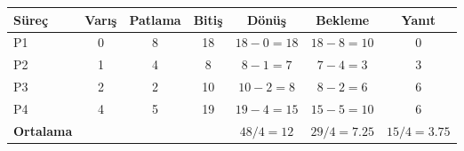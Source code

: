 \begin{tabular}{@{}lcccccc@{}}
\toprule
\textbf{Süreç} & \textbf{Varış} & \textbf{Patlama} & \textbf{Bitiş} & \textbf{Dönüş} & \textbf{Bekleme} & \textbf{Yanıt}\\
\midrule
P1 & 0 & 8 & 18 & $18-0=18$ & $18-8=10$ & 0\\
P2 & 1 & 4 & 8 & $8-1=7$ & $7-4=3$ & 3\\
P3 & 2 & 2 & 10 & $10-2=8$ & $8-2=6$ & 6\\
P4 & 4 & 5 & 19 & $19-4=15$ & $15-5=10$ & 6\\
\midrule
\textbf{Ortalama} &  &  &  & $48/4=12$ & $29/4=7.25$ & $15/4=3.75$\\
\bottomrule
\end{tabular}
